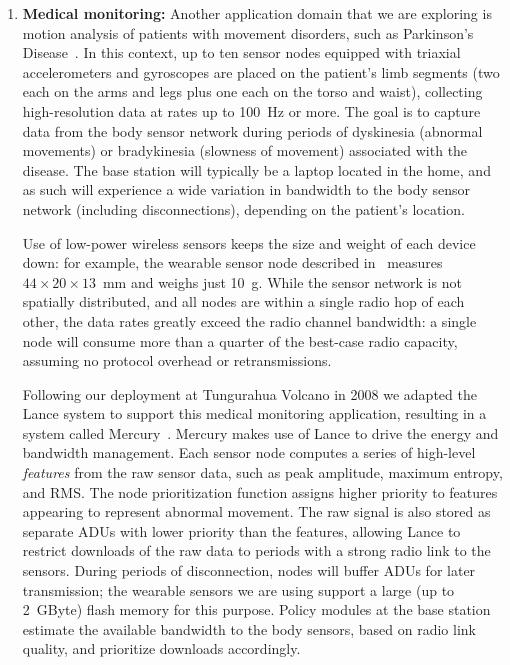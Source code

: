 \begin{enumerate}
\item \textbf{Medical monitoring:} Another application domain that we are
exploring is motion analysis of patients with movement disorders, such as
Parkinson's Disease~\cite{parkinsons-embs07}. In this context, up to ten
sensor nodes equipped with triaxial accelerometers and gyroscopes are placed
on the patient's limb segments (two each on the arms and legs plus one each
on the torso and waist), collecting high-resolution data at rates up to
100~Hz or more. The goal is to capture data from the body sensor network
during periods of dyskinesia (abnormal movements) or bradykinesia (slowness
of movement) associated with the disease. The base station will typically be
a laptop located in the home, and as such will experience a wide variation in
bandwidth to the body sensor network (including disconnections), depending on
the patient's location.

Use of low-power wireless sensors keeps the size and weight of each device
down: for example, the wearable sensor node described
in~\cite{parkinsons-embs07} measures $44 \times 20 \times 13$~mm and weighs
just 10~g.  While the sensor network is not spatially distributed, and all
nodes are within a single radio hop of each other, the data rates greatly
exceed the radio channel bandwidth: a single node will consume more than a
quarter of the best-case radio capacity, assuming no protocol overhead or
retransmissions.

Following our deployment at Tungurahua Volcano in 2008 we adapted the Lance
system to support this medical monitoring application, resulting in a system
called Mercury~\cite{mercury-sensys09}. Mercury makes use of Lance to drive
the energy and bandwidth management. Each sensor node computes a series of
high-level \textit{features} from the raw sensor data, such as peak
amplitude, maximum entropy, and RMS. The node prioritization function assigns
higher priority to features appearing to represent abnormal movement. The raw
signal is also stored as separate ADUs with lower priority than the features,
allowing Lance to restrict downloads of the raw data to periods with a strong
radio link to the sensors. During periods of disconnection, nodes will buffer
ADUs for later transmission; the wearable sensors we are using support a
large (up to 2~GByte) flash memory for this purpose. Policy modules at the
base station estimate the available bandwidth to the body sensors, based on
radio link quality, and prioritize downloads accordingly.

\end{enumerate}
